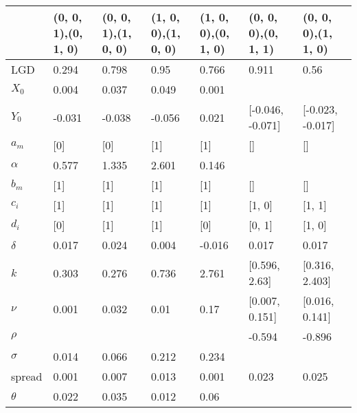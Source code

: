 \begin{table}[H]
\begin{adjustbox}{width=\textwidth}
\begin{tabular}{lllllll}
	\toprule
	{} & (0, 0, 1),(0, 1, 0) & (0, 0, 1),(1, 0, 0) & (1, 0, 0),(1, 0, 0) & (1, 0, 0),(0, 1, 0) & (0, 0, 0),(0, 1, 1) & (0, 0, 0),(1, 1, 0) \\
	\midrule
	LGD    &               0.294 &               0.798 &                0.95 &               0.766 &               0.911 &                0.56 \\
	$X_0$    &               0.004 &               0.037 &               0.049 &               0.001 &                     &                     \\
	$Y_0$    &              -0.031 &              -0.038 &              -0.056 &               0.021 &    [-0.046, -0.071] &    [-0.023, -0.017] \\
	$a_m$    &                 [0] &                 [0] &                 [1] &                 [1] &                  [] &                  [] \\
	$\alpha$  &               0.577 &               1.335 &               2.601 &               0.146 &                     &                     \\
	$b_m$    &                 [1] &                 [1] &                 [1] &                 [1] &                  [] &                  [] \\
	$c_i$    &                 [1] &                 [1] &                 [1] &                 [1] &              [1, 0] &              [1, 1] \\
	$d_i$    &                 [0] &                 [1] &                 [1] &                 [0] &              [0, 1] &              [1, 0] \\
	$\delta$  &               0.017 &               0.024 &               0.004 &              -0.016 &               0.017 &               0.017 \\
	$k$      &               0.303 &               0.276 &               0.736 &               2.761 &       [0.596, 2.63] &      [0.316, 2.403] \\
	$\nu$     &               0.001 &               0.032 &                0.01 &                0.17 &      [0.007, 0.151] &      [0.016, 0.141] \\
	$\rho$    &                     &                     &                     &                     &              -0.594 &              -0.896 \\
	$\sigma$  &               0.014 &               0.066 &               0.212 &               0.234 &                     &                     \\
	spread &               0.001 &               0.007 &               0.013 &               0.001 &               0.023 &               0.025 \\
	$\theta$  &               0.022 &               0.035 &               0.012 &                0.06 &                     &                     \\
	\bottomrule
\end{tabular}
		
	\end{adjustbox}
	
\end{table}

